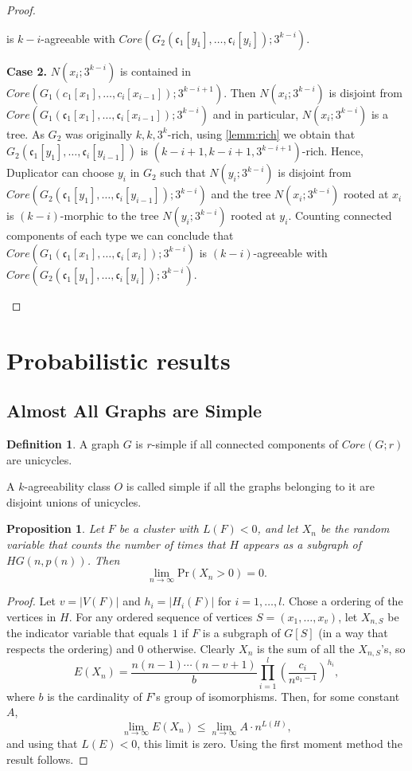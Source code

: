 \documentclass[11pt,notitlepage,a4paper]{article}
\newtheorem{proposition}{Proposition}[section]
\theoremstyle{definition}
\newtheorem{definition}{Definition}[section]
\newcommand{\cc}{\mathfrak{c}}
\newcommand{\Ln}{\lim\limits_{n\to \infty}}
\begin{document}
\begin{proof}
\begin{itemize}[leftmargin=*]
			is $k-i$-agreeable with  $Core(G_2(\cc_1[y_1],\dots,\cc_i[y_i]);3^{k-i})$.
			\par
		\textbf{Case 2.} $N(x_i;3^{k-i})$ is contained in 
			$Core(G_1(c_1[x_1],\dots,c_i[x_{i-1}]);3^{k-i+1})$. Then
			$N(x_i;3^{k-i})$ is disjoint from $Core(G_1(\cc_1[x_1],\dots,\cc_i[x_{i-1}]);3^{k-i})$
			and in particular, $N(x_i;3^{k-i})$ is a tree. As $G_2$
			was originally $k,k,3^k$-rich, using \cref{lemm:rich} we obtain
			that $G_2(\cc_1[y_1],\dots,\cc_i[y_{i-1}])$ is
			$(k-i+1,k-i+1,3^{k-i+1})$-rich. Hence,
			Duplicator can choose $y_i$ in $G_2$ such that $N(y_i;3^{k-i})$ is disjoint from \\
			$Core(G_2(\cc_1[y_1],\dots,\cc_i[y_{i-1}]);3^{k-i})$ and the tree $N(x_i;3^{k-i})$
			rooted at $x_i$ is $(k-i)$-morphic to the tree $N(y_i;3^{k-i})$ rooted at $y_i$.
			Counting connected components of each type we can conclude that
			$Core(G_1(\cc_1[x_1],\dots,\cc_i[x_i]);3^{k-i})$
			is $(k-i)$-agreeable with  $Core(G_2(\cc_1[y_1],\dots,\cc_i[y_i]);3^{k-i})$.
		  	\end{itemize}
\end{proof}

\section{Probabilistic results}


\subsection{Almost All Graphs are Simple}

\begin{definition} 
	A graph $G$ is $r$-simple if all connected components of $Core(G;r)$
	are unicycles. 
\end{definition}

A $k$-agreeability class $O$ is called simple if all the graphs
belonging to it are disjoint unions of unicycles.
 

\begin{proposition}\label{prop:supercritical}
	Let $F$ be a cluster with $L(F)<0$, and let $X_n$ be the
	random variable that counts the number of times that $H$ appears
	as a subgraph of $HG(n,p(n))$. Then
	\[\Ln \mathrm{Pr}(X_n>0)=0. \]
\end{proposition}
\begin{proof}
	Let $v=|V(F)|$ and $h_i=|H_i(F)|$ for $i=1,\dots, l$. 
	Chose a ordering of the vertices in $H$. 
	For any ordered sequence of vertices $S=(x_1, \dots, x_v)$, 
	let $X_{n,S}$ be the indicator variable that equals $1$ if $F$
	is a subgraph of $G[S]$ (in a way that respects the ordering) and
	$0$ otherwise. Clearly $X_n$ is the sum of all the $X_{n,S}$'s, so
	\[ E(X_n)= \frac{n(n-1)\cdots (n-v+1)}{b} \prod_{i=1}^{l}
	\left( \frac{c_i}{n^{a_1-1}}\right)^{h_i}, \] 
	where $b$ is the cardinality of $F$'s group of isomorphisms. 
	Then, for some constant $A$,
	\[ \Ln E(X_n)\leq \Ln A\cdot n^{L(H)}, \]
	and using that $L(E)<0$, this limit is zero.
	Using the first moment method the result follows. 
\end{proof}
\end{document}
